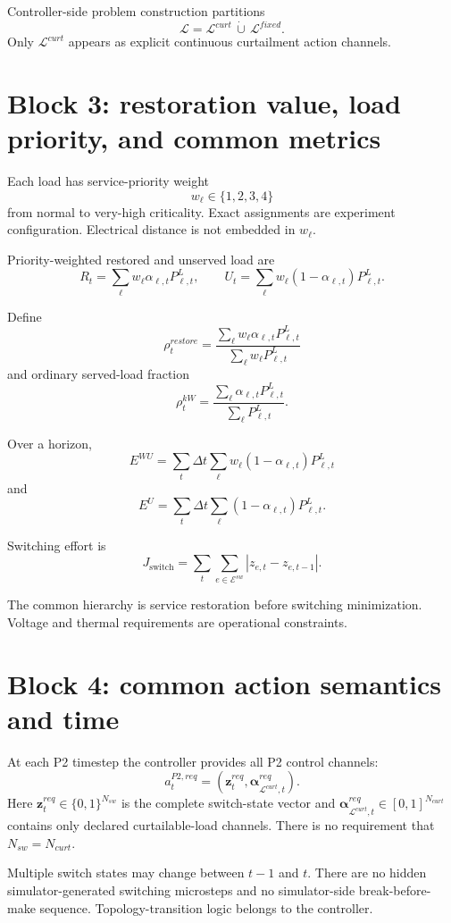 \documentclass[11pt]{article}
\begin{document}
Controller-side problem construction partitions
\[
\boxed{\mathcal L=\mathcal L^{curt}\,\dot\cup\,\mathcal L^{fixed}.}
\]
Only $\mathcal L^{curt}$ appears as explicit continuous curtailment action channels.

\section{Block 3: restoration value, load priority, and common metrics}
Each load has service-priority weight
\[
\boxed{w_\ell\in\{1,2,3,4\}}
\]
from normal to very-high criticality. Exact assignments are experiment configuration.
Electrical distance is not embedded in $w_\ell$.

Priority-weighted restored and unserved load are
\[
R_t=\sum_\ell w_\ell\alpha_{\ell,t}P_{\ell,t}^L,
\qquad
U_t=\sum_\ell w_\ell(1-\alpha_{\ell,t})P_{\ell,t}^L.
\]

Define
\[
\boxed{
\rho_t^{restore}
=
\frac{\sum_\ell w_\ell\alpha_{\ell,t}P_{\ell,t}^{L}}
{\sum_\ell w_\ell P_{\ell,t}^{L}}
}
\]
and ordinary served-load fraction
\[
\boxed{
\rho_t^{kW}
=
\frac{\sum_\ell \alpha_{\ell,t}P_{\ell,t}^{L}}
{\sum_\ell P_{\ell,t}^{L}}.
}
\]

Over a horizon,
\[
\boxed{
E^{WU}=\sum_t\Delta t\sum_\ell w_\ell(1-\alpha_{\ell,t})P_{\ell,t}^{L}}
\]
and
\[
\boxed{
E^{U}=\sum_t\Delta t\sum_\ell(1-\alpha_{\ell,t})P_{\ell,t}^{L}.}
\]

Switching effort is
\[
\boxed{
J_{\mathrm{switch}}
=
\sum_t\sum_{e\in\mathcal E^{sw}}|z_{e,t}-z_{e,t-1}|.}
\]

The common hierarchy is service restoration before switching minimization.
Voltage and thermal requirements are operational constraints.

\section{Block 4: common action semantics and time}
At each P2 timestep the controller provides all P2 control channels:
\[
\boxed{
a_t^{P2,req}
=
\left(
\mathbf z_t^{req},
\boldsymbol\alpha_{\mathcal L^{curt},t}^{req}
\right).}
\]
Here $\mathbf z_t^{req}\in\{0,1\}^{N_{sw}}$ is the complete switch-state vector and
$\boldsymbol\alpha_{\mathcal L^{curt},t}^{req}\in[0,1]^{N_{curt}}$ contains only
declared curtailable-load channels. There is no requirement that $N_{sw}=N_{curt}$.

Multiple switch states may change between $t-1$ and $t$. There are no hidden
simulator-generated switching microsteps and no simulator-side break-before-make
sequence. Topology-transition logic belongs to the controller.
\end{document}
